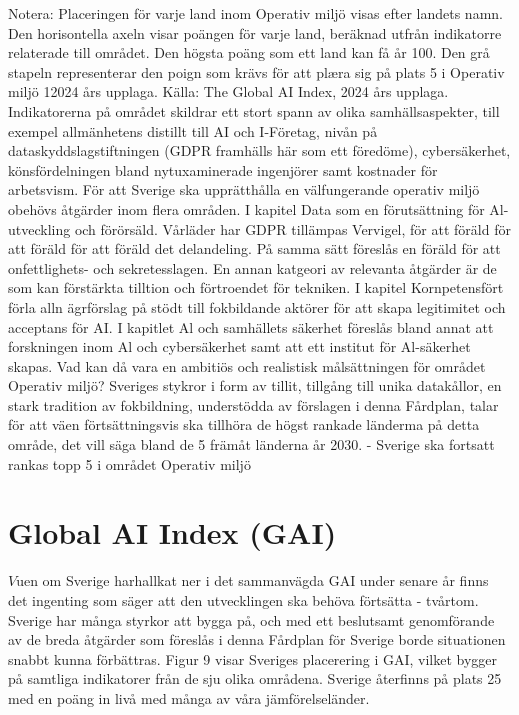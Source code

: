 {{}
Notera: Placeringen för varje land inom Operativ miljö visas efter landets namn. Den horisontella axeln visar poängen för varje land, beräknad utfrån indikatorre relaterade till området. Den högsta poäng som ett land kan få år 100. Den grå stapeln representerar den poign som krävs för att plæra sig på plats 5 i Operativ miljö 12024 års upplaga.
Källa: The Global AI Index, 2024 års upplaga.
Indikatorerna på området skildrar ett stort spann av olika samhällsaspekter, till exempel allmänhetens distillt till AI och I-Företag, nivån på dataskyddslagstiftningen (GDPR framhälls här som ett föredöme), cybersäkerhet, könsfördelningen bland nytuxaminerade ingenjörer samt kostnader för arbetsvism.
För att Sverige ska upprätthålla en välfungerande operativ miljö obehövs åtgärder inom flera områden. I kapitel Data som en förutsättning för Al-utveckling och förörsäld. Vårläder har GDPR tillämpas Vervigel, för att föräld för att föräld för att föräld det delandeling. På samma sätt föreslås en föräld för att onfettlighets- och sekretesslagen. En annan katgeori av relevanta åtgärder är de som kan förstärkta tilltion och förtroendet för tekniken. I kapitel Kornpetensfört förla alln ägrförslag på stödt till fokbildande aktörer för att skapa legitimitet och acceptans för AI. I kapitlet Al och samhällets säkerhet föreslås bland annat att forskningen inom Al och cybersäkerhet samt att ett institut för Al-säkerhet skapas.
Vad kan då vara en ambitiös och realistisk målsättningen för området Operativ miljö? Sveriges stykror i form av tillit, tillgång till unika datakållor, en stark tradition av fokbildning, understödda av förslagen i denna Fårdplan, talar för att väen förtsättningsvis ska tillhöra de högst rankade länderma på detta område, det vill säga bland de 5 främåt länderna år 2030.
- Sverige ska fortsatt rankas topp 5 i området Operativ miljö
\section*{Global AI Index (GAI)}
\(V\)uen om Sverige harhallkat ner i det sammanvägda GAI under senare år finns det ingenting som säger att den utvecklingen ska behöva förtsätta - tvårtom. Sverige har många styrkor att bygga på, och med ett beslutsamt genomförande av de breda åtgärder som föreslås i denna Fårdplan för Sverige borde situationen snabbt kunna förbättras.
Figur 9 visar Sveriges placerering i GAI, vilket bygger på samtliga indikatorer från de sju olika områdena. Sverige återfinns på plats 25 med en poäng in livå med många av våra jämförelseländer.

}
